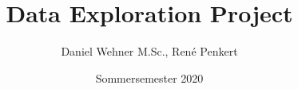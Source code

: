 



\newcommand{\modulkatalog}{\externalurl{https://www.dhbw.de/fileadmin/user/public/SP/MA/Wirtschaftsinformatik/Data_Science.pdf}{Modulkatalog}}
\newcommand{\template}{\externalurl{https://de.overleaf.com/latex/templates/astronomy-and-astrophysics-template/ngdddtchkbcg}{\LaTeX{} Template}}
\newcommand{\curemannheim}{\externalurl{https://curemannheim.de/wp/}{Cure Mannheim e.\,V.}}


\title[Data Exploration Project]{Data Exploration Project}
\author{Daniel Wehner M.Sc., René Penkert}
\date{Sommersemester 2020}




\dwPrintTitle

\dwPrintToc


